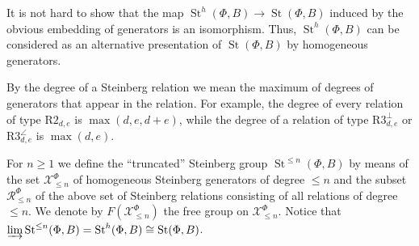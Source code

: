 \documentclass[10pt,a4paper,twoside]{article}
\theoremstyle{remark}
\theoremstyle{definition}
\numberwithin{lemma}{section}
\numberwithin{prop}{section}
\numberwithin{corollary}{section}
\numberwithin{externaltheorem}{section}
\DeclareMathOperator{\St}{St}
\numberwithin{equation}{section}
\begin{document}
It is not hard to show that the map $\St^h(\Phi, B) \to \St(\Phi, B)$ induced by the obvious embedding of generators is an isomorphism. Thus, $\St^h(\Phi, B)$ can be considered as an alternative presentation of $\St(\Phi, B)$ by homogeneous generators.

By the degree of a Steinberg relation we mean the maximum of degrees of generators that appear in the relation.
For example, the degree of every relation of type $\text{R2}_{d,e}$ is $\max(d,e,d+e)$, while the degree of a relation of type $\text{R3}^\bot_{d,e}$ or $\text{R3}^\angle_{d,e}$ is $\max(d,e)$.

For $n\geq 1$ we define the ``truncated'' Steinberg group $\St^{\leq n}(\Phi, B)$ by means of the set $\mathcal{X}_{\leq n}^\Phi$ of homogeneous Steinberg generators of degree $\leq n$ and the subset $\mathcal{R}_{\leq n}^\Phi$ of the above set of Steinberg relations consisting of all relations of degree $\leq n$.  We denote by $F(\mathcal{X}^\Phi_{\leq n})$ the free group on $\mathcal{X}^\Phi_{\leq n}$. Notice that $\varinjlim\limits \St^{\leq n}(\Phi, B) = \St^h(\Phi, B) \cong \St(\Phi, B)$.
\end{document}
